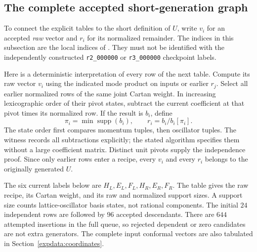 \subsection{The complete accepted short-generation graph}
\label{expfinite:generation-graph}

To connect the explicit tables to the short definition of $U$, write
$v_i$ for an accepted \emph{raw} vector and $r_i$ for its normalized
remainder. The indices in this subsection are the local indices of
.
They must not be identified with the independently constructed
\texttt{r2\_000000} or \texttt{r3\_000000} checkpoint labels.

Here is a deterministic interpretation of every row of the next table.
Compute its raw vector $v_i$ using the indicated mode product on inputs
or earlier $r_j$. Select all earlier normalized rows of the same joint
Cartan weight. In increasing lexicographic order of their pivot states,
subtract the current coefficient at that pivot times its normalized
row. If the result is $b_i$, define
\[
 \pi_i=\min\operatorname{supp}(b_i),\qquad
 r_i=b_i/b_i[\pi_i].
\]
The state order first compares momentum tuples, then oscillator tuples.
The witness records all subtractions explicitly; the stated algorithm
specifies them without a large coefficient matrix. Distinct unit pivots
supply the independence proof. Since only earlier rows enter a recipe,
every $v_i$ and every $r_i$ belongs to the originally generated $U$.

The six current labels below are $H_L,E_L,F_L,H_R,E_R,F_R$.
The table gives the raw recipe, its Cartan weight, and its raw and
normalized support sizes. A support size counts lattice-oscillator
basis states, not rational components. The initial $24$ independent
rows are followed by $96$ accepted descendants. There are $644$
attempted insertions in the full queue, so rejected dependent or zero
candidates are not extra generators. The complete input conformal
vectors are also tabulated in Section~\ref{expdata:coordinates}.

